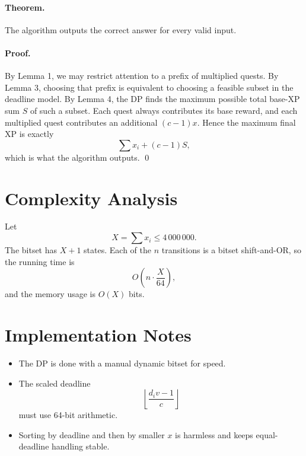 \documentclass[11pt]{article}
\begin{document}
\paragraph{Theorem.}
The algorithm outputs the correct answer for every valid input.

\paragraph{Proof.}
By Lemma 1, we may restrict attention to a prefix of multiplied quests.
By Lemma 3, choosing that prefix is equivalent to choosing a feasible subset in the deadline model.
By Lemma 4, the DP finds the maximum possible total base-XP sum $S$ of such a subset.
Each quest always contributes its base reward, and each multiplied quest contributes an additional
$(c-1)x$.
Hence the maximum final XP is exactly
\[
    \sum x_i + (c-1)S,
\]
which is what the algorithm outputs. \qed

\section*{Complexity Analysis}

Let
\[
    X = \sum x_i \le 4\,000\,000.
\]
The bitset has $X+1$ states.
Each of the $n$ transitions is a bitset shift-and-OR, so the running time is
\[
    O\!\left(n \cdot \frac{X}{64}\right),
\]
and the memory usage is $O(X)$ bits.

\section*{Implementation Notes}

\begin{itemize}[leftmargin=*]
    \item The DP is done with a manual dynamic bitset for speed.
    \item The scaled deadline
    \[
        \left\lfloor \frac{d_i v - 1}{c} \right\rfloor
    \]
    must use 64-bit arithmetic.
    \item Sorting by deadline and then by smaller $x$ is harmless and keeps equal-deadline handling stable.
\end{itemize}
\end{document}
